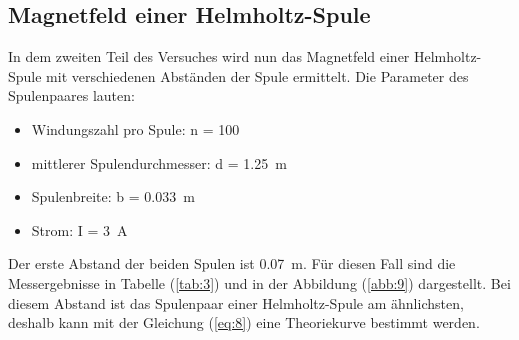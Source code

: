 \subsection{Magnetfeld einer Helmholtz-Spule}

In dem zweiten Teil des Versuches wird nun das Magnetfeld einer Helmholtz-Spule mit
verschiedenen Abständen der Spule ermittelt. Die Parameter des Spulenpaares lauten:

\begin{itemize}
  \item Windungszahl pro Spule: n = 100
  \item mittlerer Spulendurchmesser: d = \SI{1.25}{\meter}
  \item Spulenbreite: b = \SI{0.033}{\meter}
  \item Strom: I = \SI{3}{\ampere}
\end{itemize}

Der erste Abstand der beiden Spulen ist \SI{0.07}{\meter}. Für diesen Fall sind
die Messergebnisse in Tabelle (\ref{tab:3}) und in der Abbildung (\ref{abb:9})
dargestellt. Bei diesem Abstand ist das Spulenpaar einer Helmholtz-Spule am ähnlichsten,
deshalb kann mit der Gleichung (\ref{eq:8}) eine Theoriekurve bestimmt werden.

